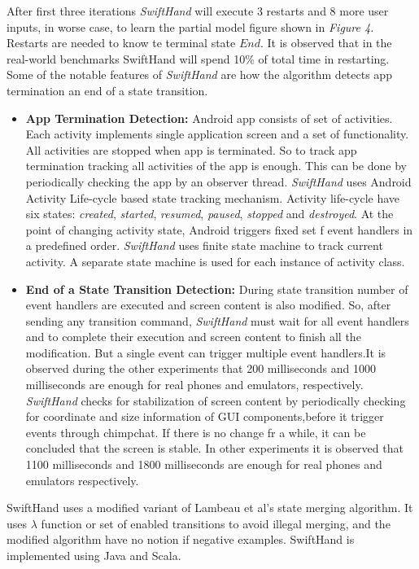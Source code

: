 \documentclass[authoryear,preprint, twocolumn]{sigplanconf}
\begin{document}
\newline After first three iterations \emph{SwiftHand} will execute 3 restarts and 8 more user inputs, in worse case, to learn the partial model figure shown in \emph{Figure 4}. Restarts are needed to know te terminal state $End$. It is observed that in the real-world benchmarks SwiftHand will spend 10\% of total time in restarting. 
\newline Some of the notable features of \emph{SwiftHand} are how the algorithm detects app termination an end of a state transition.
\begin{itemize}
	\item \textbf{App Termination Detection:} Android app consists of set of activities. Each activity implements single application screen and a set of functionality. All activities are stopped when app is terminated. So to track app termination tracking all activities of the app is enough. This can be done by periodically checking the app by an observer thread. \emph{SwiftHand} uses Android Activity Life-cycle based state tracking mechanism. Activity life-cycle  have six states: \emph{created}, \emph{started}, \emph{resumed}, \emph{paused}, \emph{stopped} and \emph{destroyed}. At the point of changing activity state, Android triggers fixed set f event handlers in a predefined order. \emph{SwiftHand} uses finite state machine to track current activity. A separate state machine is used for each instance of activity class.
	
	\item \textbf{End of a State Transition Detection:} During state transition number of event handlers are executed and screen content is also modified. So, after sending any transition command, \emph{SwiftHand} must wait for all event handlers and to complete their execution and screen content to finish all the modification. But a single event can trigger multiple event handlers.It is observed during the other experiments that 200 milliseconds and 1000 milliseconds are enough for real phones and emulators, respectively. \emph{SwiftHand} checks for stabilization of screen content by periodically checking for coordinate and size information of GUI components,before it trigger events through \textsf{chimpchat}. If there is no change fr a while, it can be concluded that the screen is stable. In other experiments it is observed that 1100 milliseconds and 1800 milliseconds are enough for real phones and emulators respectively.
\end{itemize}

\newline SwiftHand uses a modified variant of Lambeau et al's state merging algorithm. It uses $\lambda$ function or set of enabled transitions to avoid illegal merging, and the modified algorithm have no notion if negative examples. SwiftHand is implemented using Java and Scala.
\end{document}
